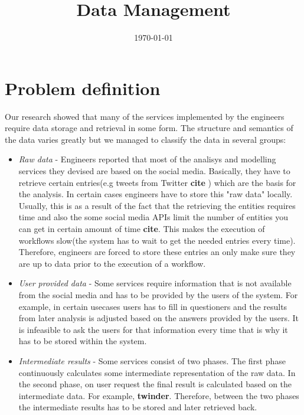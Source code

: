 \documentclass[a4paper, notitlepage]{article}
\begin{document}
\title{Data Management} 
\date{\today}
\maketitle


\section{Problem definition}

Our research showed that many of the services implemented by the engineers require data storage and retrieval in some form. The structure and semantics of the data varies greatly but we managed to classify the data in several groups:

\begin{itemize}

	\item \textit{Raw data} - Engineers reported that most of the analisys and modelling services they devised are based on the social media. Basically, they have to retrieve certain entries(e.g tweets from Twitter \textbf{cite} ) which are the basis for the analysis. In certain cases engineers have to store this "raw data" locally. Usually, this is as a result of the fact that the retrieving the entities requires time and also the some social media APIs limit the number of entities you can get in certain amount of time \textbf{cite}. This makes the execution of workflows slow(the system has to wait to get the needed entries every time). Therefore, engineers are forced to store these entries an only make sure they are up to data prior to the execution of a workflow.
	
	\item \textit{User provided data} - Some services require information that is not available from the social media and has to be provided by the users of the system. For example, in certain usecases users has to fill in questioners and the results from later analysis is adjusted based on the answers provided by the users. It is infeasible to ask the users for that information every time that is why it has to be stored within the system.
	
	\item \textit{Intermediate results} - Some services consist of two phases. The first phase continuously calculates some intermediate representation of the raw data. In the second phase, on user request the final result is calculated based on the intermediate data. For example, \textbf{twinder}. Therefore, between the two phases the intermediate results has to be stored and later retrieved back.
	

\end{itemize}
\end{document}
